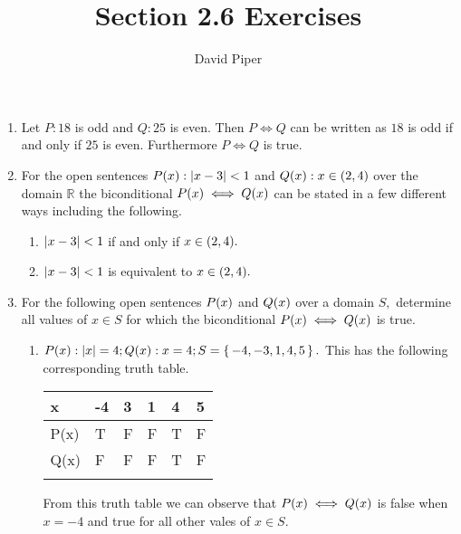 \documentclass[12pt]{article}
\title{Section 2.6 Exercises}
\author{David Piper}
\makeatletter
\newcommand*{\arabicodd}[1]{%
  \expandafter\@arabicodd\csname c@#1\endcsname
}
\newcommand*{\@arabicodd}[1]{%
  \@arabic{\numexpr(#1)*2-1\relax}%
}
\makeatother
\begin{document}
\maketitle

\begin{enumerate}[label=2.\arabicodd*, start=18]
  \item Let $P: 18$ is odd and $Q: 25$ is even. Then $P \iff Q$ can be written
        as $18$ is odd if and only if $25$ is even. Furthermore  $P \iff Q$ is true.
  \item For the open sentences $P\qty(x): \abs{x-3} < 1$ and $Q\qty(x): x \in \qty(2,4)$
        over the domain $\mathbb{R}$ the biconditional $P\qty(x) \iff Q\qty(x)$ can be
        stated in a few different ways including the following.
        \begin{enumerate}[label=\arabic*.]
          \item $\abs{x-3}<1$ if and only if $x \in \qty(2,4).$
          \item $\abs{x-3}<1$ is equivalent to $x \in \qty(2,4).$
        \end{enumerate}
  \item For the following open sentences $P\qty(x)$ and $Q\qty(x)$ over a domain
        $S,$ determine all values of $x \in S$ for which the biconditional
        $P\qty(x) \iff Q\qty(x)$ is true.
        \begin{enumerate}[label=(\alph*)]
          \item $P\qty(x): \abs{x}=4; Q\qty(x): x=4; S=\set{-4,-3,1,4,5}.$
                This has the following corresponding truth table.
                \hfill
                \hfill
                \linebreak
                \linebreak
                \begin{minipage}{0.4\linewidth}
                  \begin{tabular}{@{}llllll@{}}
                    \toprule
                    x    & -4 & 3 & 1 & 4 & 5 \\ \midrule
                    P(x) & T  & F & F & T & F \\
                    Q(x) & F  & F & F & T & F \\
                         &    &   &   &   &   \\ \bottomrule
                  \end{tabular}
                \end{minipage}
                \linebreak
                \linebreak
                From this truth table we can observe that $P\qty(x) \iff Q\qty(x)$
                is false when $x=-4$ and true for all other vales of $x \in S.$
        \end{enumerate}
\end{enumerate}
\end{document}
